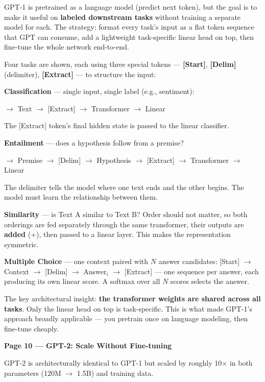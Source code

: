 GPT-1 is pretrained as a language model (predict next token), but the goal is to make it useful on \textbf{labeled downstream tasks} without training a separate model for each. The strategy: format every task's input as a flat token sequence that GPT can consume, add a lightweight task-specific linear head on top, then fine-tune the whole network end-to-end.

Four tasks are shown, each using three special tokens --- \textbf{[Start]}, \textbf{[Delim]} (delimiter), \textbf{[Extract]} --- to structure the input:

\noindent\textbf{Classification} --- single input, single label (e.g., sentiment):

\medskip
\noindent [Start] $\to$ Text $\to$ [Extract] $\to$ Transformer $\to$ Linear

\medskip
\noindent The [Extract] token's final hidden state is passed to the linear classifier.

\noindent\textbf{Entailment} --- does a hypothesis follow from a premise?

\medskip
\noindent [Start] $\to$ Premise $\to$ [Delim] $\to$ Hypothesis $\to$ [Extract] $\to$ Transformer $\to$ Linear

\medskip
\noindent The delimiter tells the model where one text ends and the other begins. The model must learn the relationship between them.

\noindent\textbf{Similarity} --- is Text A similar to Text B? Order should not matter, so both orderings are fed separately through the same transformer, their outputs are \textbf{added} (+), then passed to a linear layer. This makes the representation symmetric.

\noindent\textbf{Multiple Choice} --- one context paired with $N$ answer candidates:
[Start] $\to$ Context $\to$ [Delim] $\to$ Answer$_i$ $\to$ [Extract] --- one sequence per answer, each producing its own linear score. A softmax over all $N$ scores selects the answer.

The key architectural insight: \textbf{the transformer weights are shared across all tasks}. Only the linear head on top is task-specific. This is what made GPT-1's approach broadly applicable --- you pretrain once on language modeling, then fine-tune cheaply.

\medskip
\noindent\textbf{Page 10 --- GPT-2: Scale Without Fine-tuning}

GPT-2 is architecturally identical to GPT-1 but scaled by roughly 10$\times$ in both parameters (120M $\to$ 1.5B) and training data.

